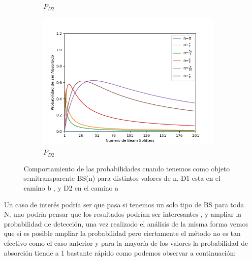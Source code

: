 \documentclass[11pt]{article}
\begin{document}
\begin{figure}[h!]
\begin{subfigure}[b]{0.45\linewidth}
\caption{$P_{D2}$}
\label{fig:westminster_aerea}
\end{subfigure}
\begin{subfigure}[b]{0.45\linewidth}
\includegraphics[width=\linewidth]{absorbido_azuna.png}
\caption{$P_{D2}$}
\label{fig:BS1}
\end{subfigure}
\caption{Comportamiento de las probabilidades cuando tenemos como objeto semitransparente BS(n) para distintos valores de n, D1 esta en el camino b , y D2 en el camino a}
\label{fig:westminster}
\end{figure} 


Un caso de interés podría ser que pasa si tenemos un solo tipo de BS para toda N, uno podría pensar que los resultados podrían ser interesantes , y ampliar la probabilidad de detección, una vez realizado el análisis de la misma forma vemos que si es posible ampliar la probabilidad pero ciertamente el método no es tan efectivo como el caso anterior y para la mayoría de los valores la probabilidad de absorción tiende a 1 bastante rápido  como podemos observar a continuación:
\end{document}
